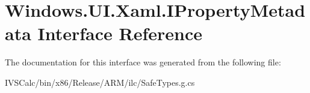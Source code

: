 \hypertarget{interface_windows_1_1_u_i_1_1_xaml_1_1_i_property_metadata}{}\section{Windows.\+U\+I.\+Xaml.\+I\+Property\+Metadata Interface Reference}
\label{interface_windows_1_1_u_i_1_1_xaml_1_1_i_property_metadata}


The documentation for this interface was generated from the following file\+:\begin{DoxyCompactItemize}
\item 
I\+V\+S\+Calc/bin/x86/\+Release/\+A\+R\+M/ilc/Safe\+Types.\+g.\+cs\end{DoxyCompactItemize}
